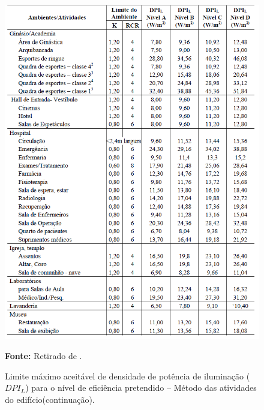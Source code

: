 \documentclass[12pt, openright, oneside, a4paper, english, brazil]{abntex2}   %
\begin{document}
\begin{figure}[H]
\centering
\includegraphics[width = 1.1\textwidth]{Figuras/tab1_2.PNG}
\caption{Limite máximo aceitável de densidade de potência de iluminação ($DPI_L$) para o nível de eficiência pretendido – Método das atividades do edifício(continuação).}
\label{tab2_2}
\textbf{Fonte:} Retirado de \cite{RTQ-C}.
\end{figure}
\end{document}
